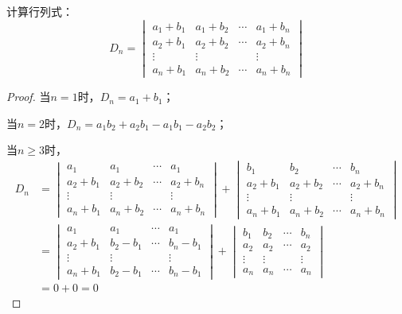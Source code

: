 \begin{problem}
计算行列式：
\begin{equation*}
    D_n=
    \begin{vmatrix}
        a_{1}+b_{1} & a_{1}+b_{2} & \cdots & a_{1}+b_{n} \\
        a_{2}+b_{1} & a_{2}+b_{2} & \cdots & a_{2}+b_{n} \\
        \vdots      & \vdots      &        & \vdots      \\
        a_{n}+b_{1} & a_{n}+b_{2} & \cdots & a_{n}+b_{n}
    \end{vmatrix}
\end{equation*}
\end{problem}
\begin{proof}
    当\(n=1\)时，\(D_n=a_1+b_1\)；

    当\(n=2\)时，\(D_n=a_1b_2+a_2b_1-a_1b_1-a_2b_2\)；

    当\(n\geq3\)时，
    \begin{align*}
        D_n & =
        \begin{vmatrix}
            a_{1}       & a_{1}       & \cdots & a_{1}       \\
            a_{2}+b_{1} & a_{2}+b_{2} & \cdots & a_{2}+b_{n} \\
            \vdots      & \vdots      &        & \vdots      \\
            a_{n}+b_{1} & a_{n}+b_{2} & \cdots & a_{n}+b_{n}
        \end{vmatrix}+
        \begin{vmatrix}
            b_{1}       & b_{2}       & \cdots & b_{n}       \\
            a_{2}+b_{1} & a_{2}+b_{2} & \cdots & a_{2}+b_{n} \\
            \vdots      & \vdots      &        & \vdots      \\
            a_{n}+b_{1} & a_{n}+b_{2} & \cdots & a_{n}+b_{n}
        \end{vmatrix} \\
            & =
        \begin{vmatrix}
            a_{1}       & a_{1}       & \cdots & a_{1}       \\
            a_{2}+b_{1} & b_{2}-b_{1} & \cdots & b_{n}-b_{1} \\
            \vdots      & \vdots      &        & \vdots      \\
            a_{n}+b_{1} & b_{2}-b_{1} & \cdots & b_{n}-b_{1}
        \end{vmatrix}+
        \begin{vmatrix}
            b_{1}  & b_{2}  & \cdots & b_{n}  \\
            a_{2}  & a_{2}  & \cdots & a_{2}  \\
            \vdots & \vdots &        & \vdots \\
            a_{n}  & a_{n}  & \cdots & a_{n}
        \end{vmatrix}                \\
            & =0+0=0
    \end{align*}
\end{proof}

